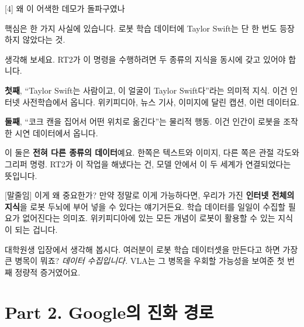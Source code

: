\documentclass[aspectratio=169,10pt]{beamer}
\newenvironment{script}{%
  \footnotesize
  \setlength{\parskip}{0.5em}
  \setlength{\parindent}{0pt}
}{}
\begin{document}
\begin{frame}{[4] 왜 이 어색한 데모가 돌파구였나}
\begin{script}
핵심은 한 가지 사실에 있습니다. \alert{로봇 학습 데이터에 Taylor Swift는 단 한 번도 등장하지 않았다}는 것.

생각해 보세요. RT2가 이 명령을 수행하려면 두 종류의 지식을 동시에 갖고 있어야 합니다.

\textbf{첫째}, ``Taylor Swift는 사람이고, 이 얼굴이 Taylor Swift다''라는 의미적 지식. 이건 인터넷 사전학습에서 옵니다. 위키피디아, 뉴스 기사, 이미지에 달린 캡션, 이런 데이터요.

\textbf{둘째}, ``코크 캔을 집어서 어떤 위치로 옮긴다''는 물리적 행동. 이건 인간이 로봇을 조작한 시연 데이터에서 옵니다.

이 둘은 \textbf{전혀 다른 종류의 데이터}예요. 한쪽은 텍스트와 이미지, 다른 쪽은 관절 각도와 그리퍼 명령. RT2가 이 작업을 해냈다는 건, 모델 안에서 이 두 세계가 \alert{연결}되었다는 뜻입니다.

[말줄임] 이게 왜 중요한가? 만약 정말로 이게 가능하다면, 우리가 가진 \textbf{인터넷 전체의 지식}을 로봇 두뇌에 부어 넣을 수 있다는 얘기거든요. 학습 데이터를 일일이 수집할 필요가 없어진다는 의미죠. 위키피디아에 있는 모든 개념이 로봇이 활용할 수 있는 지식이 되는 겁니다.

대학원생 입장에서 생각해 봅시다. 여러분이 로봇 학습 데이터셋을 만든다고 하면 가장 큰 병목이 뭐죠? \textit{데이터 수집입니다.} VLA는 그 병목을 우회할 가능성을 보여준 첫 번째 정량적 증거였어요.
\end{script}
\end{frame}

\section{Part 2. Google의 진화 경로}
\end{document}
